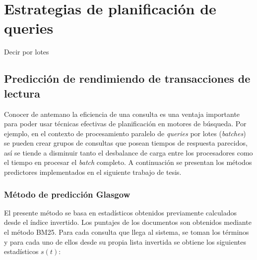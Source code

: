 \chapter{Estrategias de planificación de queries}
\label{cap:epq}

Decir por lotes

\section{Predicción de rendimiendo de transacciones de lectura}
\label{scheduling:prtl}
Conocer de antemano la eficiencia de una consulta es una ventaja importante para poder usar técnicas efectivas de planificación en motores de búsqueda. Por ejemplo, en el contexto de procesamiento paralelo de \textit{queries} por lotes (\textit{batches}) se pueden crear grupos de consultas que posean tiempos de respuesta parecidos, así se tiende a disminuir tanto el desbalance de carga entre los procesadores como el tiempo en procesar el \textit{batch} completo.
A continuación se presentan los métodos predictores implementados en el siguiente trabajo de tesis. 

\subsection{Método de predicción Glasgow}
\label{scheduling:glasgow}
El presente método \citep{Macdonald:2012} se basa en estadísticos obtenidos previamente calculados desde el índice invertido. Los puntajes de los documentos son obtenidos mediante el método BM25. Para cada consulta que llega al sistema, se toman los términos y para cada uno de ellos desde su propia lista invertida se obtiene los siguientes estadísticos $s(t)$:


